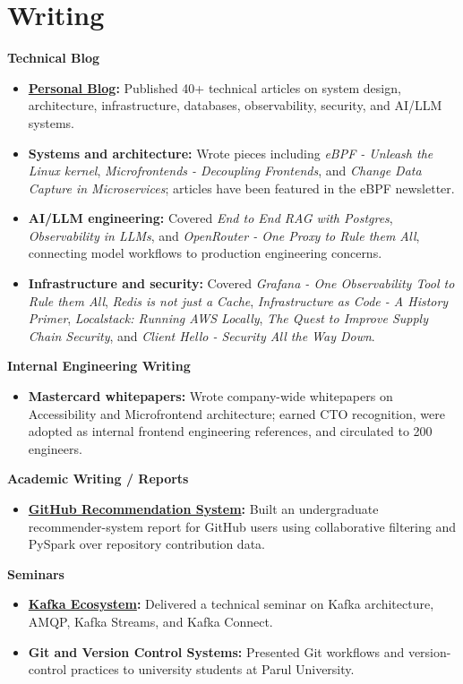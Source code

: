 \documentclass[10pt,a4paper]{article}
\begin{document}
\section*{Writing}
\textbf{Technical Blog}
\begin{itemize}
  \item \textbf{\href{https://aymanace2049.hashnode.dev}{Personal Blog}:} Published 40+ technical articles on system design, architecture, infrastructure, databases, observability, security, and AI/LLM systems.
  \item \textbf{Systems and architecture:} Wrote pieces including \textit{eBPF - Unleash the Linux kernel}, \textit{Microfrontends - Decoupling Frontends}, and \textit{Change Data Capture in Microservices}; articles have been featured in the eBPF newsletter.
  \item \textbf{AI/LLM engineering:} Covered \textit{End to End RAG with Postgres}, \textit{Observability in LLMs}, and \textit{OpenRouter - One Proxy to Rule them All}, connecting model workflows to production engineering concerns.
  \item \textbf{Infrastructure and security:} Covered \textit{Grafana - One Observability Tool to Rule them All}, \textit{Redis is not just a Cache}, \textit{Infrastructure as Code - A History Primer}, \textit{Localstack: Running AWS Locally}, \textit{The Quest to Improve Supply Chain Security}, and \textit{Client Hello - Security All the Way Down}.
\end{itemize}
\textbf{Internal Engineering Writing}
\begin{itemize}
  \item \textbf{Mastercard whitepapers:} Wrote company-wide whitepapers on Accessibility and Microfrontend architecture; earned CTO recognition, were adopted as internal frontend engineering references, and circulated to 200 engineers.
\end{itemize}
\textbf{Academic Writing / Reports}
\begin{itemize}
  \item \textbf{\href{https://drive.google.com/file/d/1iKV_xFES7ByKqhxLe3ffbDuWSnKmVFsI/view?usp=sharing}{GitHub Recommendation System}:} Built an undergraduate recommender-system report for GitHub users using collaborative filtering and PySpark over repository contribution data.
\end{itemize}
\textbf{Seminars}
\begin{itemize}
  \item \textbf{\href{https://drive.google.com/file/d/1txqBQZaRxxT7wu5csBuIHUfi8DrRvUMU/view?usp=sharing}{Kafka Ecosystem}:} Delivered a technical seminar on Kafka architecture, AMQP, Kafka Streams, and Kafka Connect.
  \item \textbf{Git and Version Control Systems:} Presented Git workflows and version-control practices to university students at Parul University.
\end{itemize}
\end{document}
